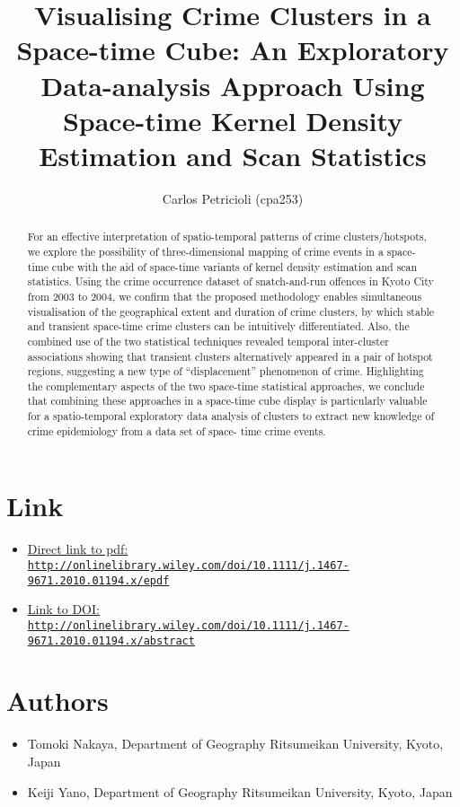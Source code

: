 \documentclass[11pt,letterpaper,english]{article}
\title{Visualising Crime Clusters in a Space-time Cube: An Exploratory Data-analysis Approach Using Space-time Kernel Density Estimation and
Scan Statistics}
\author{Carlos Petricioli (cpa253)}
\begin{document}
\maketitle

\begin{abstract}
For an effective interpretation of spatio-temporal patterns of crime clusters/hotspots, we explore the possibility of three-dimensional mapping of crime events in a space- time cube with the aid of space-time variants of kernel density estimation and scan statistics. Using the crime occurrence dataset of snatch-and-run offences in Kyoto City from 2003 to 2004, we confirm that the proposed methodology enables simultaneous visualisation of the geographical extent and duration of crime clusters, by which stable and transient space-time crime clusters can be intuitively differentiated. Also, the combined use of the two statistical techniques revealed temporal inter-cluster associations showing that transient clusters alternatively appeared in a pair of hotspot regions, suggesting a new type of “displacement” phenomenon of crime. Highlighting the complementary aspects of the two space-time statistical approaches, we conclude that combining these approaches in a space-time cube display is particularly valuable for a spatio-temporal exploratory data analysis of clusters to extract new knowledge of crime epidemiology from a data set of space- time crime events.

\end{abstract}

\section*{Link}

\begin{itemize}
\item \href{http://www.kdd.org/kdd2016/papers/files/adp1044-wangA.pdf}{Direct link to pdf:\\ \texttt{http://onlinelibrary.wiley.com/doi/10.1111/j.1467-9671.2010.01194.x/epdf}}

\item \href{https://dl.acm.org/citation.cfm?doid=2939672.2939736}{Link to DOI:\\ \texttt{http://onlinelibrary.wiley.com/doi/10.1111/j.1467-9671.2010.01194.x/abstract}}
\end{itemize}


\section*{Authors}
\begin{itemize}

\item Tomoki Nakaya,
Department of Geography Ritsumeikan University, Kyoto, Japan


\item Keiji Yano,
Department of Geography Ritsumeikan University, Kyoto, Japan

\end{itemize}
\end{document}
